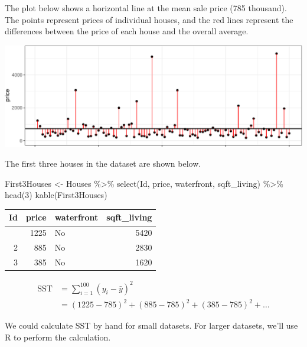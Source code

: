 \documentclass[
  letterpaper,
  DIV=11,
  numbers=noendperiod]{scrreprt}
\newenvironment{Shaded}{\begin{snugshade}}{\end{snugshade}}
\newcommand{\CommentTok}[1]{\textcolor[rgb]{0.37,0.37,0.37}{#1}}
\newcommand{\DecValTok}[1]{\textcolor[rgb]{0.68,0.00,0.00}{#1}}
\newcommand{\DocumentationTok}[1]{\textcolor[rgb]{0.37,0.37,0.37}{\textit{#1}}}
\newcommand{\FunctionTok}[1]{\textcolor[rgb]{0.28,0.35,0.67}{#1}}
\newcommand{\NormalTok}[1]{\textcolor[rgb]{0.00,0.23,0.31}{#1}}
\newcommand{\OtherTok}[1]{\textcolor[rgb]{0.00,0.23,0.31}{#1}}
\newcommand{\SpecialCharTok}[1]{\textcolor[rgb]{0.37,0.37,0.37}{#1}}
\begin{document}
The plot below shows a horizontal line at the mean sale price (785
thousand). The points represent prices of individual houses, and the red
lines represent the differences between the price of each house and the
overall average.

\includegraphics{Ch2_files/figure-pdf/unnamed-chunk-19-1.pdf}

The first three houses in the dataset are shown below.

\begin{Shaded}
\begin{Highlighting}[]
\NormalTok{First3Houses }\OtherTok{\textless{}{-}}\NormalTok{ Houses }\SpecialCharTok{\%\textgreater{}\%} \FunctionTok{select}\NormalTok{(Id, price, waterfront, sqft\_living) }\SpecialCharTok{\%\textgreater{}\%} \FunctionTok{head}\NormalTok{(}\DecValTok{3}\NormalTok{)}
\FunctionTok{kable}\NormalTok{(First3Houses)}
\end{Highlighting}
\end{Shaded}

\begin{longtable}[]{@{}rrlr@{}}
\toprule\noalign{}
Id & price & waterfront & sqft\_living \\
\midrule\noalign{}
\endhead
\bottomrule\noalign{}
\endlastfoot
1 & 1225 & No & 5420 \\
2 & 885 & No & 2830 \\
3 & 385 & No & 1620 \\
\end{longtable}

\[
\begin{aligned}
\text{SST} & = \displaystyle\sum_{i=1}^{100} (y_i - \bar{y})^2 \\
& = (1225-785)^2 + (885-785)^2 + (385-785)^2 + \ldots 
\end{aligned}
\]

We could calculate SST by hand for small datasets. For larger datasets,
we'll use R to perform the calculation.

\begin{Shaded}
\end{Shaded}
\end{document}
